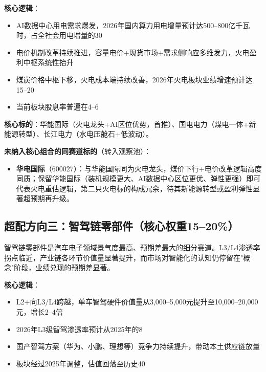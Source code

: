 \textbf{核心逻辑}：
\vspace{0.2em}
\begin{itemize}[leftmargin=2em]
\item AI数据中心用电需求爆发，2026年国内算力用电增量预计达500--800亿千瓦时，占全社会用电增量的30%
\item 电价机制改革持续推进，容量电价+现货市场+需求侧响应多维发力，火电盈利中枢系统性抬升
\item 煤炭价格中枢下移，火电成本端持续改善，2026年火电板块业绩增速预计达15--20%
\item 当前板块股息率普遍在4--6%
\end{itemize}

\textbf{核心标的}：华能国际（火电龙头+AI区位优势，首推）、国电电力（煤电一体+新能源转型）、长江电力（水电压舱石+低波动）。

\textbf{未纳入核心组合的同赛道标的}（转入观察池）：
\vspace{0.2em}
\begin{itemize}[leftmargin=2em]
\item \textbf{华电国际}（600027）：与华能国际同为火电龙头，煤价下行+电价改革逻辑高度同质；保留华能国际（装机规模更大、AI数据中心区位更优、弹性更强）即可代表火电重估逻辑，第二只火电标的构成冗余，待其新能源转型或盈利弹性显著超预期再升级。
\end{itemize}

\subsection{超配方向三：智驾链零部件（核心权重15--20\%）}

智驾链零部件是汽车电子领域景气度最高、预期差最大的细分赛道。L3/L4渗透率拐点临近，产业链各环节价值量显著提升，而市场对智能化的认知仍停留在"概念"阶段，业绩兑现的预期差显著。

\textbf{核心逻辑}：
\vspace{0.2em}
\begin{itemize}[leftmargin=2em]
\item L2+向L3/L4跨越，单车智驾硬件价值量从3,000--5,000元提升至10,000--20,000元，增长2--4倍
\item 2026年L3级智驾渗透率预计从2025年的8%
\item 国产智驾方案（华为、小鹏、理想等）竞争力持续提升，带动本土供应链放量
\item 板块经过2025年调整，估值回落至历史40%
\end{itemize}


